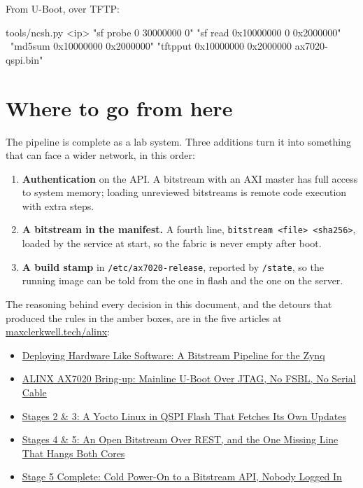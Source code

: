 \documentclass[11pt,a4paper,oneside]{article}
\newcommand{\file}[1]{{\color{bluemid}\nolinkurl{#1}}}
\newcommand{\cmd}[1]{\texttt{#1}}
\newcommand{\blog}[2]{\href{https://maxclerkwell.tech/posts/#1/}{#2}}
\newcommand{\series}{\href{https://maxclerkwell.tech/alinx/}{maxclerkwell.tech/alinx}}
\begin{document}
From U-Boot, over TFTP:

\begin{shell}
tools/ncsh.py <ip> "sf probe 0 30000000 0" "sf read 0x10000000 0 0x2000000" \
  "md5sum 0x10000000 0x2000000" "tftpput 0x10000000 0x2000000 ax7020-qspi.bin"
\end{shell}

\section{Where to go from here}

The pipeline is complete as a lab system. Three additions turn it into
something that can face a wider network, in this order:

\begin{enumerate}
  \item \textbf{Authentication} on the API. A bitstream with an AXI master
        has full access to system memory; loading unreviewed bitstreams is
        remote code execution with extra steps.
  \item \textbf{A bitstream in the manifest.} A fourth line,
        \cmd{bitstream <file> <sha256>}, loaded by the service at start, so
        the fabric is never empty after boot.
  \item \textbf{A build stamp} in \file{/etc/ax7020-release}, reported by
        \file{/state}, so the running image can be told from the one in flash
        and the one on the server.
\end{enumerate}

The reasoning behind every decision in this document, and the detours that
produced the rules in the amber boxes, are in the five articles at \series:

\begin{itemize}
  \item \blog{zynq-bitstream-deployment-concept-august-2026}{Deploying Hardware Like Software: A Bitstream Pipeline for the Zynq}
  \item \blog{alinx-bring-up-jtag-detected-without-power-august-2026}{ALINX AX7020 Bring-up: Mainline U-Boot Over JTAG, No FSBL, No Serial Cable}
  \item \blog{alinx-ax7020-yocto-linux-qspi-august-2026}{Stages 2 \& 3: A Yocto Linux in QSPI Flash That Fetches Its Own Updates}
  \item \blog{alinx-ax7020-open-bitstream-rest-api-september-2026}{Stages 4 \& 5: An Open Bitstream Over REST, and the One Missing Line That Hangs Both Cores}
  \item \blog{alinx-ax7020-cold-boot-to-bitstream-api-september-2026}{Stage 5 Complete: Cold Power-On to a Bitstream API, Nobody Logged In}
\end{itemize}
\end{document}
